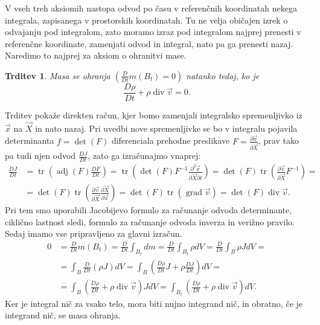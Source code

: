\documentclass[a4paper,twoside]{article}
\theoremstyle{definition} %
\theoremstyle{plain} %
\newtheorem{trditev}[definicija]{Trditev}
\numberwithin{equation}{section}
\renewcommand{\div}{\operatorname{div}}
\newcommand{\grad}{\operatorname{grad}}
\newcommand{\dpar}[2]{\ensuremath{\frac{\partial #1}{\partial #2}}}
\newcommand{\DD}[2]{\ensuremath{\frac{D #1}{D #2}}}
\newcommand{\DDt}[1]{\DD{#1}{t}}
\newcommand{\vv}{\vec{v}}
\newcommand{\vX}{\vec{X}}
\newcommand{\vx}{\vec{x}}
\DeclareMathOperator{\tr}{tr}
\begin{document}
V vseh treh aksiomih nastopa odvod po času v referenčnih koordinatah nekega
integrala, zapisanega v prostorskih koordinatah. Tu ne velja običajen izrek o
odvajanju pod integralom, zato moramo izraz pod integralom najprej prenesti v
referenčne koordinate, zamenjati odvod in integral, nato pa ga prenesti nazaj.
Naredimo to najprej za aksiom o ohranitvi mase.
\begin{trditev} Masa se ohranja $(\DDt{}m(B_t) = 0)$ natanko tedaj, ko je
  \begin{equation}
    \DDt\rho + \rho\div\vv = 0.
    \label{eq:ohr-masa}
  \end{equation}
\end{trditev}
\proof
Trditev pokaže direkten račun, kjer bomo zamenjali integralsko spremenljivko iz
$\vx$ na $\vX$ in nato nazaj. Pri uvedbi nove spremenljivke se bo v integralu
pojavila determinanta $f = \det(F)$ diferenciala prehodne preslikave $F =
\dpar{\vx}{\vX}$, prav tako pa tudi njen odvod $\DDt{J}$, zato ga izračunajmo vnaprej:
\begin{align*}
  \DDt J &= \tr\left(\operatorname{adj}(F) \DDt{F}\right) =
  \tr\left(\det(F)F^{-1} \dpar{^2\vx}{\vX\partial t}\right) =
  \det(F)\tr\left(\dpar{\vv}{\vX}F^{-1}\right) = \\ &=
  \det(F)\tr\left(\dpar{\vv}{\vX}\dpar{\vX}{\vx}\right) =
  \det(F)\tr\left(\grad \vv\right) =
  \det(F)\div \vv.
\end{align*}
Pri tem smo uporabili Jacobijevo formulo za računanje odvoda
determinante, ciklično lastnost sledi, formulo za računanje odvoda inverza in verižno pravilo.
Sedaj imamo vse pripravljeno za glavni izračun.
\begin{align*}
  0 &= \DDt{}m(B_t) =
  \DDt{} \int_{B_t} dm =
  \DDt{} \int_{B_t} \rho dV =
  \DDt{} \int_{B} \rho J dV =\\ &=
  \int_{B} \DDt{}(\rho J) dV =
  \int_{B}\left( \DDt{\rho} J + \rho \DDt{J} \right)dV = \\ &=
  \int_{B}\left( \DDt{\rho}  + \rho \div\vv\right) J dV =
  \int_{B_t}\left( \DDt{\rho}  + \rho \div\vv\right) dV.
\end{align*}
Ker je integral nič za vsako telo, mora biti nujno integrand nič, in obratno, če
je integrand nič, se masa ohranja.
\endproof
\end{document}
